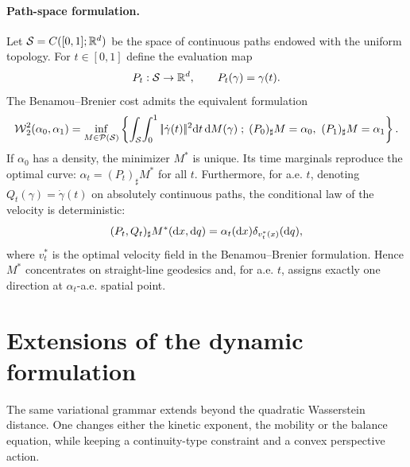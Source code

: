 \paragraph{Path-space formulation.}\label{rem-bb-path-space}
	Let $\mathcal{S}=C([0,1];\mathbb{R}^d)$ be the space of continuous paths endowed with the uniform topology. For $t\in[0,1]$ define the evaluation map
	\[
		P_t:\mathcal{S}\to\mathbb{R}^d,
		\qquad
		P_t(\gamma)=\gamma(t).
	\]
	The Benamou--Brenier cost admits the equivalent formulation
	\[
		\operatorname{\mathcal{W}}_2^2(\alpha_0,\alpha_1)
		=
		\inf_{M\in\mathcal{P}(\mathcal{S})}
		\left\{ 
			\int_{\mathcal{S}}\!\int_0^1|\!| \dot\gamma(t) |\!|^2\mathrm{d} t\,\mathrm{d} M(\gamma)
		 \;;\; 
			(P_0)_\sharp M=\alpha_0,\ (P_1)_\sharp M=\alpha_1
		 \right\}.
	\]
	If $\alpha_0$ has a density, the minimizer $M^*$ is unique. Its time marginals reproduce the optimal curve: $\alpha_t=(P_t)_\sharp M^*$ for all $t$. Furthermore, for a.e. $t$, denoting $Q_t(\gamma)=\dot\gamma(t)$ on absolutely continuous paths, the conditional law of the velocity is deterministic:
	\[
		(P_t,Q_t)_\sharp M^*(\mathrm{d} x,\mathrm{d} q)
		=
		\alpha_t(\mathrm{d} x)\delta_{v_t^*(x)}(\mathrm{d} q),
	\]
	where $v_t^*$ is the optimal velocity field in the Benamou--Brenier formulation. Hence $M^*$ concentrates on straight-line geodesics and, for a.e. $t$, assigns exactly one direction at $\alpha_t$-a.e. spatial point.

\section{Extensions of the dynamic formulation}
\label{sec-bb-extensions}

The same variational grammar extends beyond the quadratic Wasserstein distance. One changes either the kinetic exponent, the mobility or the balance equation, while keeping a continuity-type constraint and a convex perspective action.

